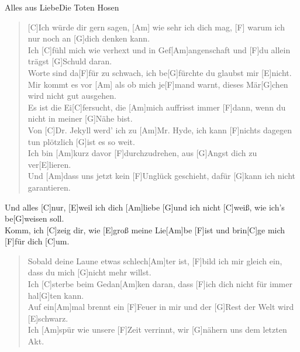 \begin{song}{Alles aus Liebe}{Die Toten Hosen}

    \begin{intro}
        [C Am F G]
    \end{intro}
    
    \begin{verse}
        [C]Ich würde dir gern sagen, [Am] wie sehr ich dich mag, [F]
        warum ich nur noch an [G]dich denken kann.\\
        Ich [C]fühl mich wie verhext und in Gef[Am]angenschaft
        und [F]du allein trägst [G]Schuld daran.\\
        [Am]Worte sind da[F]für zu schwach,
        ich be[G]fürchte du glaubst mir [E]nicht.\\
        Mir kommt es vor [Am] als ob mich je[F]mand warnt,
        dieses Mär[G]chen wird nicht gut ausgehen.\\
        Es ist die Ei[C]fersucht, die [Am]mich auffrisst
        immer [F]dann, wenn du nicht in meiner [G]Nähe bist.\\
        Von [C]Dr. Jekyll werd' ich zu [Am]Mr. Hyde,
        ich kann [F]nichts dagegen tun
        plötzlich [G]ist es so weit.\\
        Ich bin [Am]kurz davor [F]durchzudrehen,
        aus [G]Angst dich zu ver[E]lieren.\\
        Und [Am]dass uns jetzt kein [F]Unglück geschieht,
        dafür [G]kann ich nicht garantieren.
    \end{verse}
    
    \begin{chorus}
    Und alles [C]nur, [E]weil ich dich [Am]liebe
    [G]und ich nicht [C]weiß, wie ich's be[G]weisen soll.\\
    Komm, ich [C]zeig dir, wie [E]groß meine Lie[Am]be [F]ist
    und brin[C]ge mich [F]für dich [C]um.
    \end{chorus}
    
    \begin{verse}
        Sobald deine Laune etwas schlech[Am]ter ist,
        [F]bild ich mir gleich ein, dass du mich [G]nicht mehr willst.\\
        Ich [C]sterbe beim Gedan[Am]ken daran,
        dass [F]ich dich nicht für immer hal[G]ten kann.\\
        Auf ein[Am]mal brennt ein [F]Feuer in mir
        und der [G]Rest der Welt wird [E]schwarz.\\
        Ich [Am]spür wie unsere [F]Zeit verrinnt,
        wir [G]nähern uns dem letzten Akt.
    \end{verse}
    

\end{song}
